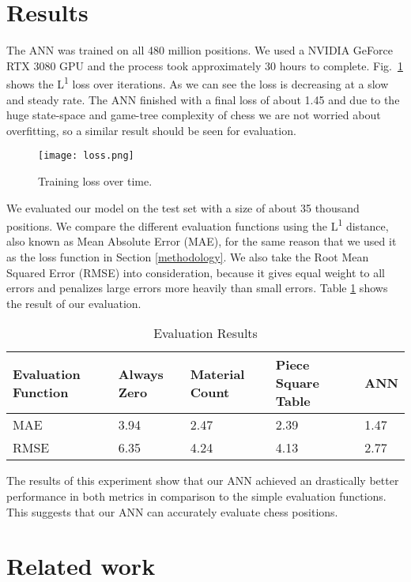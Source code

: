 \documentclass[conference]{IEEEtran}
\begin{document}
\section{Results}\label{results}
The ANN was trained on all 480 million positions. We used a NVIDIA GeForce RTX 3080 GPU and the process took approximately 30 hours to complete. Fig.~\ref{loss figure} shows the L\textsuperscript{1} loss over iterations. As we can see the loss is decreasing at a slow and steady rate. The ANN finished with a final loss of about 1.45 and due to the huge state-space and game-tree complexity of chess we are not worried about overfitting, so a similar result should be seen for evaluation. 

\begin{figure}[htbp]
\centerline{\texttt{[image: loss.png]}}
\caption{Training loss over time.}
\label{loss figure}
\end{figure}

We evaluated our model on the test set with a size of about 35 thousand positions. We compare the different evaluation functions using the L\textsuperscript{1} distance, also known as Mean Absolute Error (MAE), for the same reason that we used it as the loss function in Section \ref{methodology}. We also take the Root Mean Squared Error (RMSE) into consideration, because it gives equal weight to all errors and penalizes large errors more heavily than small errors. Table \ref{eval table} shows the result of our evaluation.

\begin{table}[htbp]
\caption{Evaluation Results}
\begin{center}
\begin{tabular}{| m{5em} || m{4em} | m{4em} | m{4em} | m{4em} |} \hline
Evaluation Function & Always Zero & Material Count & Piece Square Table & ANN \\ \hline
MAE & 3.94 & 2.47 & 2.39 & 1.47 \\ \hline
RMSE & 6.35 & 4.24 & 4.13 & 2.77 \\ \hline
\end{tabular}
\label{eval table}
\end{center}
\end{table}

The results of this experiment show that our ANN achieved an drastically better performance in both metrics in comparison to the simple evaluation functions. This suggests that our ANN can accurately evaluate chess positions. 


\section{Related work}\label{related work}
\end{document}
